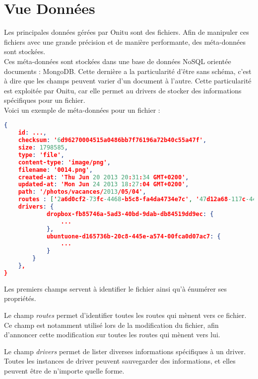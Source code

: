 \chapter{Vue Données}
\thispagestyle{EIP} %

\vspace{-0.5cm} %
Les principales données gérées par Onitu sont des fichiers. Afin de manipuler ces fichiers avec une grande précision et de manière performante, des méta-données sont stockées.\\

Ces méta-données sont stockées dans une base de données NoSQL orientée documents : MongoDB. Cette dernière a la particularité d'être sans schéma, c'est à dire que les champs peuvent varier d'un document à l'autre. Cette particularité est exploitée par Onitu, car elle permet au drivers de stocker des informations spécifiques pour un fichier.\\

Voici un exemple de méta-données pour un fichier :
\begin{lstlisting}[language=json,firstnumber=1]
{
    id: ...,
    checksum: '6d96270004515a0486bb7f76196a72b40c55a47f',
    size: 1798585,
    type: 'file',
    content-type: 'image/png',
    filename: '0014.png',
    created-at: 'Thu Jun 20 2013 20:31:34 GMT+0200',
    updated-at: 'Mon Jun 24 2013 18:27:04 GMT+0200',
    path: '/photos/vacances/2013/05/04',
    routes : ['2a6d0cf2-73fc-4468-b5c8-fa4da4734e7c', '47d12a68-117c-4410-8194-636f61c59281'],
    drivers: {
            dropbox-fb85746a-5ad3-40bd-9dab-db84519dd9ec: {
                ...
            },
            ubuntuone-d165736b-20c8-445e-a574-00fca0d07ac7: {
                ...
            }
        }
    },
}
\end{lstlisting}

Les premiers champs servent à identifier le fichier ainsi qu'à énumérer ses propriétés.

Le champ \textit{routes} permet d'identifier toutes les routes qui mènent vers ce fichier. Ce champ est notamment utilisé lors de la modification du fichier, afin d'annoncer cette modification sur toutes les routes qui mènent vers lui.

Le champ \textit{drivers} permet de lister diverses informations spécifiques à un driver. Toutes les instances de driver peuvent sauvegarder des informations, et elles peuvent être de n'importe quelle forme.
